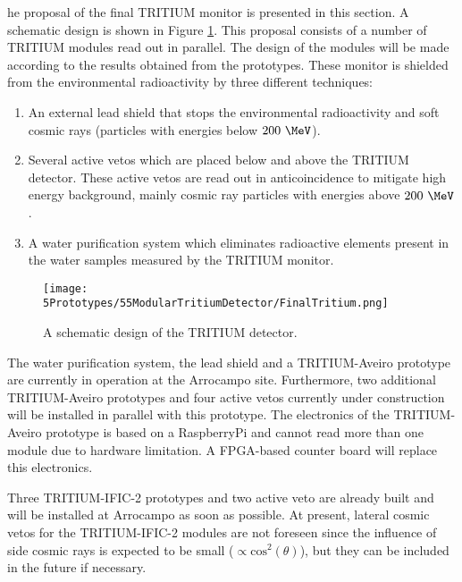 he proposal of the final TRITIUM monitor is presented in this section. A schematic design is shown in Figure \ref{fig:TritiumDetectorSchematicDesign}. This proposal consists of a number of TRITIUM modules read out in parallel. The design of the modules will be made according to the results obtained from the prototypes. These monitor is shielded from the environmental radioactivity by three different techniques:

\begin{enumerate}

\item{} An external lead shield that stops the environmental radioactivity and soft cosmic rays (particles with energies below $200~\MeV$).

\item{} Several active vetos which are placed below and above the TRITIUM detector. These active vetos are read out in anticoincidence to mitigate high energy background, mainly cosmic ray particles with energies above $200~\MeV$.

\item{} A water purification system which eliminates radioactive elements present in the water samples measured by the TRITIUM monitor.

\end{enumerate}

\begin{figure}[h]
\centering
\texttt{[image: 5Prototypes/55ModularTritiumDetector/FinalTritium.png]}
\caption{A schematic design of the TRITIUM detector.\label{fig:TritiumDetectorSchematicDesign}}
\end{figure}

The water purification system, the lead shield and a TRITIUM-Aveiro prototype are currently in operation at the Arrocampo site. Furthermore, two additional TRITIUM-Aveiro prototypes and four active vetos currently under construction will be installed in parallel with this prototype. The electronics of the TRITIUM-Aveiro prototype is based on a RaspberryPi and cannot read more than one module due to hardware limitation. A FPGA-based counter board will replace this electronics.

Three TRITIUM-IFIC-2 prototypes and two active veto are already built and will be installed at Arrocampo as soon as possible. At present, lateral cosmic vetos for the TRITIUM-IFIC-2 modules are not foreseen since the influence of side cosmic rays is expected to be small ($\propto \text{cos}^2(\theta)$), but they can be included in the future if necessary.


